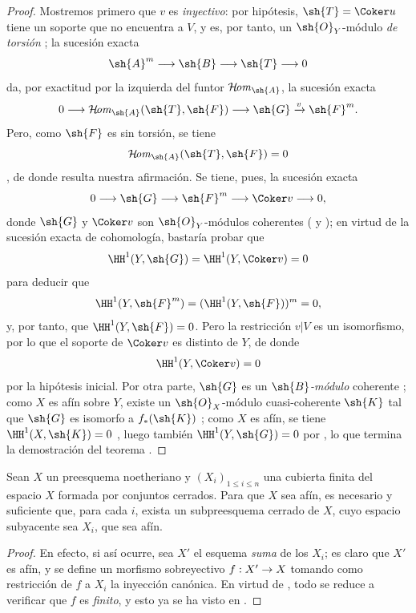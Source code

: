 \documentclass[oneside,10pt]{amsart}
\makeatletter
\renewcommand{\leq}{\leqslant}
\newcommand{\ega@arrow}[2]{\mathchoice{#1}{#2}{#2}{#2}}
\renewcommand{\to}{\ega@arrow{\longrightarrow}{\rightarrow}}
\def\shHom{\mathcal{H}\!\mathit{om}}
\newcommand{\oldpage}[2][]{\marginnote{\normalfont\footnotesize\textbf{#1}~|~#2}\ignorespaces}
\let\EGAOriginalLabel\label
\renewcommand{\label}[1]{\phantomsection\EGAOriginalLabel{#1}}
\makeatother
\begin{document}
\begin{proof}
Mostremos primero que $v$ es \emph{inyectivo}:
por hipótesis, $\sh{T}=\Coker u$ tiene un soporte que no encuentra a $V$, y es, por tanto, un $\sh{O}_Y$-módulo \emph{de torsión} ;
la sucesión exacta
\[
  \sh{A}^m\to\sh{B}\to\sh{T}\to0
\]
da, por exactitud por la izquierda del funtor $\shHom_{\sh{A}}$, la sucesión exacta
\[
  0\to\shHom_{\sh{A}}(\sh{T},\sh{F})
  \to\sh{G}\xrightarrow{v}\sh{F}^m.
\]
Pero, como $\sh{F}$ es sin torsión, se tiene
\[
  \shHom_{\sh{A}}(\sh{T},\sh{F})=0
\]
, de donde resulta nuestra afirmación.
Se tiene, pues, la sucesión exacta
\[
  0\to\sh{G}\to\sh{F}^m\to\Coker v\to0,
\]
\oldpage[II]{138}
donde $\sh{G}$ y $\Coker v$ son $\sh{O}_Y$-módulos coherentes ( y );
en virtud de la sucesión exacta de cohomología, bastaría probar que
\[
  \HH^1(Y,\sh{G})=\HH^1(Y,\Coker v)=0
\]
para deducir que
\[
  \HH^1(Y,\sh{F}^m)=(\HH^1(Y,\sh{F}))^m=0,
\]
y, por tanto, que $\HH^1(Y,\sh{F})=0$.
Pero la restricción $v|V$ es un isomorfismo, por lo que el soporte de $\Coker v$ es distinto de $Y$, de donde
\[
  \HH^1(Y,\Coker v)=0
\]
por la hipótesis inicial.
Por otra parte, $\sh{G}$ es un \emph{$\sh{B}$-módulo} coherente ;
como $X$ es afín sobre $Y$, existe un $\sh{O}_X$-módulo cuasi-coherente $\sh{K}$ tal que $\sh{G}$ es isomorfo a $f_*(\sh{K})$ ;
como $X$ es afín, se tiene $\HH^1(X,\sh{K})=0$ , luego también $\HH^1(Y,\sh{G})=0$ por , lo que termina la demostración del teorema .
\end{proof}

\begin{corollary}[6.7.2]
\label{II.6.7.2}
Sean $X$ un preesquema noetheriano y $(X_i)_{1\leq i\leq n}$ una cubierta finita del espacio $X$ formada por conjuntos cerrados.
Para que $X$ sea afín, es necesario y suficiente que, para cada $i$, exista un subpreesquema cerrado de $X$, cuyo espacio subyacente sea $X_i$, que sea afín.
\end{corollary}

\begin{proof}
En efecto, si así ocurre, sea $X'$ el esquema \emph{suma} de los $X_i$;
es claro que $X'$ es afín, y se define un morfismo sobreyectivo $f:X'\to X$ tomando como restricción de $f$ a $X_i$ la inyección canónica.
En virtud de , todo se reduce a verificar que $f$ es \emph{finito}, y esto ya se ha visto en .
\end{proof}
\end{document}

